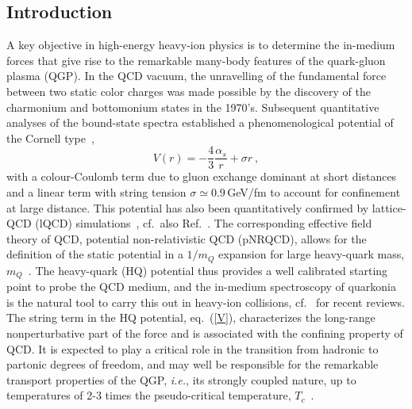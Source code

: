 \documentclass[../report.tex]{subfiles}
\begin{document}
\subsection{Introduction} %
\label{sec_intro}
A key objective in high-energy heavy-ion physics is to determine the in-medium forces that give rise to the remarkable many-body features of the quark-gluon plasma (QGP).
In the QCD vacuum, the unravelling of the fundamental force between two static color charges was made possible by the discovery of the charmonium and bottomonium states in the 1970's. 
Subsequent quantitative analyses of the bound-state spectra established a phenomenological potential of the Cornell type~\cite{Eichten:1979ms}, 
\begin{equation}
V(r) = -\frac{4}{3} \frac{\alpha_s}{r} + \sigma r \ ,
\label{V}
\end{equation} 
with a colour-Coulomb term due to gluon exchange dominant at short distances and a linear term with string tension $\sigma\simeq0.9$\,GeV/fm to account for confinement at large distance. 
This potential has also been quantitatively confirmed by lattice-QCD (lQCD) simulations~\cite{Bali:2000gf}, cf.~also Ref.~\cite{Brambilla:2004jw}. 
The corresponding effective field theory of QCD, potential non-relativistic QCD (pNRQCD), allows for the definition of the static potential in a  $1/m_Q$ expansion for large heavy-quark mass, $m_Q$~\cite{Brambilla:1999xf,Brambilla:2004wf}. 
The heavy-quark (HQ) potential thus provides a well calibrated starting point to probe the QCD medium, and the in-medium spectroscopy of quarkonia is the natural tool to carry this out in heavy-ion collisions, cf.~\cite{Rapp:2008tf,BraunMunzinger:2009ih,Kluberg:2009wc,Mocsy:2013syh,Liu:2015izf} 
for recent reviews.
The string term in the HQ potential, eq.~(\ref{V}), characterizes the long-range nonperturbative part of the force and is associated with the confining property of QCD. It is expected to play a critical role in the transition from hadronic to partonic degrees of freedom, and may well be responsible for the remarkable transport properties of the QGP, {\it i.e.}, its strongly coupled nature, up to temperatures of 2-3 times the pseudo-critical temperature, $T_c$~\cite{Liu:2016ysz}. 
\end{document}

